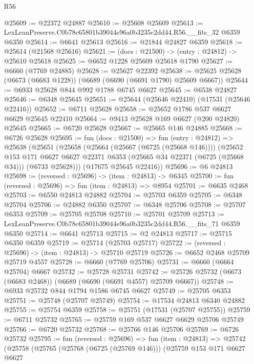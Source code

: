 \begin{lexlean}{R56}
\begin{coremodule}
@25609 := @22372 @24887
@25610 := @25608 @25609
@25613 := LexLeanPreserve.C0b78c65801b39044e96a0b3235c2dd44.R56.__fits_32 @6359 @6350
@25614 := @6641 @25613
@25616 := @21844 @24827 @6359
@25618 := @25614 (@21568 @25616)
@25621 := (docs : @21500) -> (entry : @24812) -> @25610 @25618
@25625 := @6652 @1228 @25609 @25618 @1790
@25627 := @6660 (@7769 @24885)
@25628 := @25627 @22392
@25638 := @25625 @25628 (@6673 (@6683 @1228)) (@6689 (@6690 (@6691 @1790) @25609 @6667))
@25644 := @6933 @25628 @844 @992 @1788 @6745 @6627
@25645 := @6538 @24827
@25646 := @6348 @25645
@25651 := @25644 (@25646 @22410) (@17531 (@25646 @22416))
@25652 := @6711 @25628
@25658 := @25652 @1786 @537 @6627 @6629 @25645 @22410
@25664 := @9413 @25628 @169 @6627 (@200 @24820) @25645
@25665 := @6720 @25628
@25667 := @25665 @146 @24885
@25668 := @6726 @25628
@25695 := fun (docs : @21500) =>
  fun (entry : @24812) =>
  @25638
    (@25651
      (@25658
        (@25664 (@25667 (@6725 (@25668 @146))))
        (@25652
          @153
          @171
          @6627
          @6627
          @22371
          @6353
          (@25665 @34 @22371 (@6725 (@25668 @34)))
          (@6733 @25628)))
      (@17675 @25645 @22416))
@25696 := @6 @24813
@25698 := (reversed : @25696) -> (item : @24813) -> @6345
@25700 := fun (reversed : @25696) => fun (item : @24813) => @8954
@25701 := @6635 @2468
@25703 := @6550 @24813 @24882
@25704 := @25703 @6359
@25705 := @6348 @25704
@25706 := @24882 @6350
@25707 := @6348 @25706
@25708 := @25707 @6353
@25709 := @25705 @25708
@25710 := @25701 @25709
@25713 := LexLeanPreserve.C0b78c65801b39044e96a0b3235c2dd44.R56.__fits_71 @6359 @6350
@25714 := @6641 @25713
@25715 := @2 @24813
@25717 := @25715 @6350 @6359
@25719 := @25714 (@25703 @25717)
@25722 := (reversed : @25696) -> (item : @24813) -> @25710 @25719
@25726 := @6652 @2468 @25709 @25719 @4557
@25728 := @6660 (@7769 @25706)
@25731 := @6660 (@6664 @25704) @6667
@25732 := @25728 @25731
@25742 := @25726 @25732 (@6673 (@6683 @2468)) (@6689 (@6690 (@6691 @4557) @25709 @6667))
@25748 := @6933 @25732 @844 @1794 @1586 @6745 @6627
@25749 := @25705 @6353
@25751 := @25748 (@25707 @25749)
@25754 := @17534 @24813 @6340 @24882
@25755 := @25754 @6359
@25758 := @25751 (@17531 (@25707 @25755))
@25759 := @6711 @25732
@25765 := @25759 @169 @537 @6627 @6629 @25706 @25749
@25766 := @6720 @25732
@25768 := @25766 @146 @25706
@25769 := @6726 @25732
@25795 := fun (reversed : @25696) =>
  fun (item : @24813) =>
  @25742
    (@25758
      (@25765
        (@25768 (@6725 (@25769 @146)))
        (@25759
          @153
          @171
          @6627
          @6627

\end{coremodule}
\end{lexlean}
